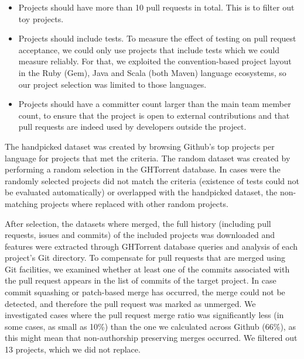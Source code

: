 \documentclass{sig-alternate}
\begin{document}
\begin{itemize}

  \item Projects should have more than 10 pull requests in total. This is
    to filter out toy projects. 

  \item Projects should include tests. To measure the effect of testing on pull
    request acceptance, we could only use projects that include tests which we
    could measure reliably. For that, we exploited the convention-based project
    layout in the Ruby (Gem), Java and Scala (both Maven) language ecosystems,
    so our project selection was limited to those languages. 

  \item Projects should have a committer count larger than the main team member
    count, to ensure that the project is open to external contributions and that
    pull requests are indeed used by developers outside the project.

\end{itemize}

The \textsf{handpicked} dataset was created by browsing Github's top projects
per language for projects that met the criteria. The \textsf{random} dataset
was created by performing a random selection in the GHTorrent database. In
cases were the randomly selected projects did not match the criteria (existence
of tests could not be evaluated automatically) or overlapped with the
\textsf{handpicked} dataset, the non-matching projects where replaced with
other random projects. 

After selection, the datasets where merged, the full history (including pull
requests, issues and commits) of the included projects was downloaded and
features were extracted through GHTorrent database queries and analysis of each
project's Git directory. To compensate for pull requests that are merged using
Git facilities, we examined whether at least one of the commits associated with
the pull request appears in the list of commits of the target project. In case
commit squashing or patch-based merge has occurred, the merge could not be
detected, and therefore the pull request was marked as unmerged. We
investigated cases where the pull request merge ratio was significantly less
(in some cases, as small as 10\%) than the one we calculated across Github
(66\%), as this might mean that non-authorship preserving merges occurred. We
filtered out 13 projects, which we did not replace. 
\end{document}
